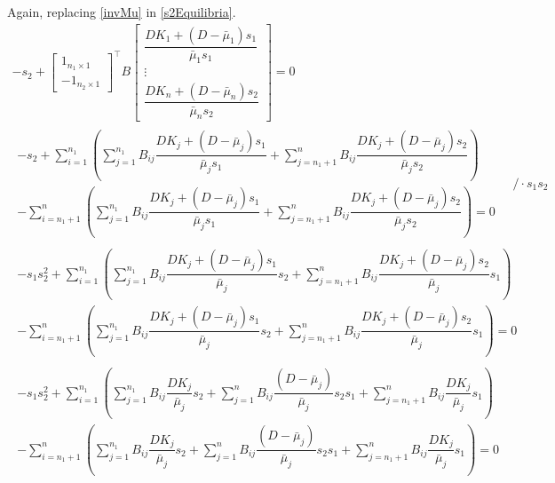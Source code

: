 \documentclass[3p,times]{article}
\begin{document}
Again, replacing \eqref{invMu} in \eqref{s2Equilibria}.
\begin{align}
-s_2+
\begin{bmatrix}
1_{n_1 \times 1}\\ - 1_{n_2 \times 1}
\end{bmatrix}^\top B\begin{bmatrix}
\dfrac{DK_1+(D-\bar{\mu}_1)s_1}{\bar{\mu}_{1}s_1} \\ \vdots \\ \dfrac{DK_n+(D-\bar{\mu}_n)s_2}{\bar{\mu}_{n}s_2} 
\end{bmatrix} = 0 \\
\begin{array}{c} \displaystyle  -s_2 + \sum \limits_{i=1}^{n_1}\left(\sum \limits_{j = 1}^{n_1} B_{ij}\dfrac{DK_j+(D-\bar{\mu}_j)s_1}{\bar{\mu}_{j}s_1} +\sum \limits_{j = n_1+1}^{n} B_{ij}\dfrac{DK_j+(D-\bar{\mu}_j)s_2}{\bar{\mu}_{j}s_2} \right) \\
\displaystyle - \sum \limits_{i=n_1+1}^{n}\left(\sum \limits_{j = 1}^{n_1} B_{ij}\dfrac{DK_j+(D-\bar{\mu}_j)s_1}{\bar{\mu}_{j}s_1} +\sum \limits_{j = n_1+1}^{n} B_{ij}\dfrac{DK_j+(D-\bar{\mu}_j)s_2}{\bar{\mu}_{j}s_2} \right)= 0
\end{array} \quad / \cdot s_1s_2 \\
\begin{array}{c} \displaystyle  -s_1s_2^2 +\sum \limits_{i=1}^{n_1}\left(\sum \limits_{j = 1}^{n_1} B_{ij}\dfrac{DK_j+(D-\bar{\mu}_j)s_1}{\bar{\mu}_{j}}s_2 +\sum \limits_{j = n_1+1}^{n} B_{ij}\dfrac{DK_j+(D-\bar{\mu}_j)s_2}{\bar{\mu}_{j}}s_1 \right) \\
\displaystyle -  \sum \limits_{i=n_1+1}^{n}\left(\sum \limits_{j = 1}^{n_1} B_{ij}\dfrac{DK_j+(D-\bar{\mu}_j)s_1}{\bar{\mu}_{j}}s_2 +\sum \limits_{j = n_1+1}^{n} B_{ij}\dfrac{DK_j+(D-\bar{\mu}_j)s_2}{\bar{\mu}_{j}}s_1 \right)= 0
\end{array} \\
\begin{array}{c} \displaystyle  -s_1s_2^2 + \sum \limits_{i=1}^{n_1}\left(\sum \limits_{j = 1}^{n_1} B_{ij}\dfrac{DK_j}{\bar{\mu}_{j}}s_2 +\sum \limits_{j = 1}^{n} B_{ij}\dfrac{(D-\bar{\mu}_j)}{\bar{\mu}_{j}}s_2s_1 + \sum \limits_{j = n_1+1}^{n} B_{ij}\dfrac{DK_j}{\bar{\mu}_{j}}s_1\right) \\
\displaystyle -  \sum \limits_{i=n_1+1}^{n}\left(\sum \limits_{j = 1}^{n_1} B_{ij}\dfrac{DK_j}{\bar{\mu}_{j}}s_2 +\sum \limits_{j = 1}^{n} B_{ij}\dfrac{(D-\bar{\mu}_j)}{\bar{\mu}_{j}}s_2s_1 + \sum \limits_{j = n_1+1}^{n} B_{ij}\dfrac{DK_j}{\bar{\mu}_{j}}s_1 \right)= 0

\end{array}
\end{align}
\end{document}
